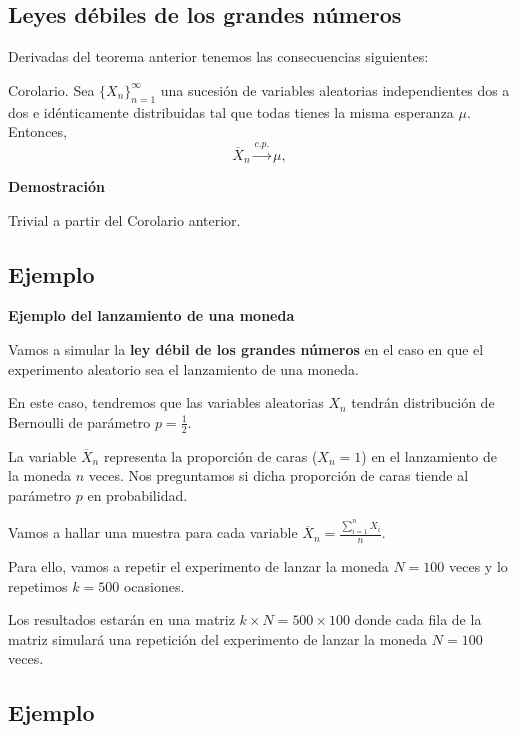 \documentclass[]{book}
\begin{document}
\hypertarget{leyes-duxe9biles-de-los-grandes-nuxfameros-4}{%
\subsection{Leyes débiles de los grandes números}\label{leyes-duxe9biles-de-los-grandes-nuxfameros-4}}

Derivadas del teorema anterior tenemos las consecuencias siguientes:

Corolario.
Sea \(\{X_n\}_{n=1}^\infty\) una sucesión de variables aleatorias independientes dos a dos e idénticamente distribuidas tal que todas tienes la misma esperanza \(\mu\). Entonces,
\[
\overline{X}_n\stackrel{c.p.}{\longrightarrow} \mu,
\]

\textbf{Demostración}

Trivial a partir del Corolario anterior.

\hypertarget{ejemplo-142}{%
\subsection{Ejemplo}\label{ejemplo-142}}

\textbf{Ejemplo del lanzamiento de una moneda}

Vamos a simular la \textbf{ley débil de los grandes números} en el caso en que el experimento aleatorio sea el lanzamiento de una moneda.

En este caso, tendremos que las variables aleatorias \(X_n\) tendrán distribución de Bernoulli de parámetro \(p=\frac{1}{2}\).

La variable \(\overline{X}_n\) representa la proporción de caras (\(X_n=1\)) en el lanzamiento de la moneda \(n\) veces. Nos preguntamos si dicha proporción de caras tiende al parámetro \(p\) en probabilidad.

Vamos a hallar una muestra para cada variable \(\overline{X}_n=\frac{\sum\limits_{i=1}^n X_i}{n}\).

Para ello, vamos a repetir el experimento de lanzar la moneda \(N=100\) veces y lo repetimos \(k=500\) ocasiones.

Los resultados estarán en una matriz \(k\times N =500\times 100\) donde cada fila de la matriz simulará una repetición del experimento de lanzar la moneda \(N=100\) veces.

\hypertarget{ejemplo-143}{%
\subsection{Ejemplo}\label{ejemplo-143}}
\end{document}
